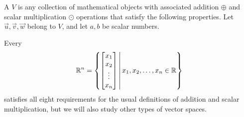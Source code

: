 \begin{applicationActivities}
\begin{definition}
  A  \(V\) is any collection of mathematical objects with
  associated addition \(\oplus\) and scalar multiplication \(\odot\)
  operations that satisfy the following properties. 
  Let \(\vec u,\vec v,\vec w\) belong to \(V\), and let \(a,b\) be scalar numbers.

  \vectorSpaceProperties

  Every 
  \[
    \mathbb{R}^n=\left\{\begin{bmatrix}x_1\\x_2\\\vdots\\x_n\end{bmatrix}\,\middle|\,x_1,x_2,\dots,x_n\in\mathbb{R}\right\}
  \] 
  satisfies all eight requirements for the usual definitions of addition
  and scalar multiplication,
  but we will also study other types of vector spaces.
\end{definition}


\end{applicationActivities}
